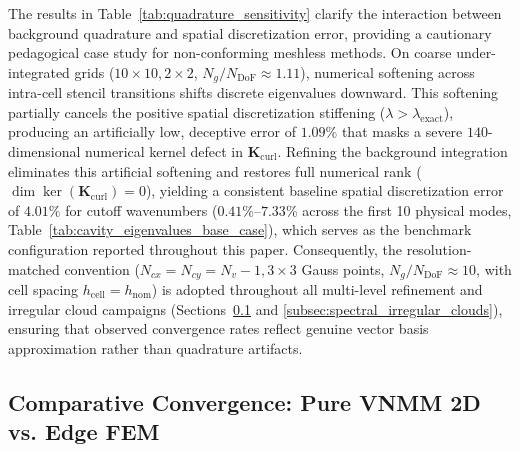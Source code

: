 \documentclass[preprint,12pt]{elsarticle}
\begin{document}
The results in Table~\ref{tab:quadrature_sensitivity} clarify the interaction between background quadrature and spatial discretization error, providing a cautionary pedagogical case study for non-conforming meshless methods. On coarse under-integrated grids ($10 \times 10, 2 \times 2$, $N_g / N_{\mathrm{DoF}} \approx 1.11$), numerical softening across intra-cell stencil transitions shifts discrete eigenvalues downward. This softening partially cancels the positive spatial discretization stiffening ($\lambda > \lambda_{\mathrm{exact}}$), producing an artificially low, deceptive error of $1.09\%$ that masks a severe $140$-dimensional numerical kernel defect in $\mathbf{K}_{\mathrm{curl}}$. Refining the background integration eliminates this artificial softening and restores full numerical rank ($\dim\ker(\mathbf{K}_{\mathrm{curl}}) = 0$), yielding a consistent baseline spatial discretization error of $4.01\%$ for cutoff wavenumbers ($0.41\%\text{--}7.33\%$ across the first 10 physical modes, Table~\ref{tab:cavity_eigenvalues_base_case}), which serves as the benchmark configuration reported throughout this paper. Consequently, the resolution-matched convention ($N_{cx} = N_{cy} = N_v - 1, 3 \times 3$ Gauss points, $N_g / N_{\mathrm{DoF}} \approx 10$, with cell spacing $h_{\mathrm{cell}} = h_{\mathrm{nom}}$) is adopted throughout all multi-level refinement and irregular cloud campaigns (Sections~\ref{subsec:convergence_comparison} and \ref{subsec:spectral_irregular_clouds}), ensuring that observed convergence rates reflect genuine vector basis approximation rather than quadrature artifacts.

\subsection{Comparative Convergence: Pure VNMM 2D vs. Edge FEM}
\label{subsec:convergence_comparison}
\end{document}
